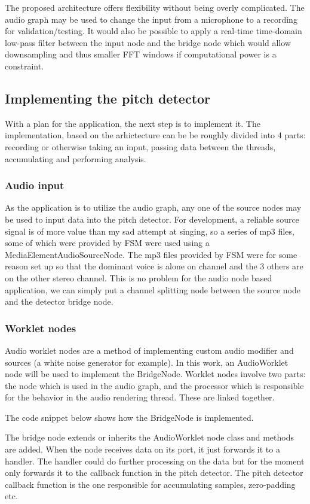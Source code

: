 The proposed architecture offers flexibility without being overly complicated. The audio graph may be used to change the input from a microphone to a recording for validation/testing. It would also be possible to apply a real-time time-domain low-pass filter between the input node and the bridge node which would allow downsampling and thus smaller FFT windows if computational power is a constraint. 

\subsection{Implementing the pitch detector}
With a plan for the application, the next step is to implement it. The implementation, based on the arhictecture can be be roughly divided into 4 parts: recording or otherwise taking an input, passing data between the threads, accumulating and performing analysis.

\subsubsection{Audio input}
As the application is to utilize the audio graph, any one of the source nodes may be used to input data into the pitch detector. For development, a reliable source signal is of more value than my sad attempt at singing, so a series of mp3 files, some of which were provided by FSM were used using a MediaElementAudioSourceNode. The mp3 files provided by FSM were for some reason set up so that the dominant voice is alone on channel and the 3 others are on the other stereo channel. This is no problem for the audio node based application, we can simply put a channel splitting node between the source node and the detector bridge node.


\subsubsection{Worklet nodes}
Audio worklet nodes are a method of implementing custom audio modifier and sources (a white noise generator for example). In this work, an AudioWorklet node will be used to implement the BridgeNode. Worklet nodes involve two parts: the node which is used in the audio graph, and the processor which is responsible for the behavior in the audio rendering thread. These are linked together.

The code snippet below shows how the BridgeNode is implemented.

The bridge node extends or inherits the AudioWorklet node class and methods are added. When the node receives data on its port, it just forwards it to a handler. The handler could do further processing on the data but for the moment only forwards it to the callback function in the pitch detector. The pitch detector callback function is the one responsible for accumulating samples, zero-padding etc.

